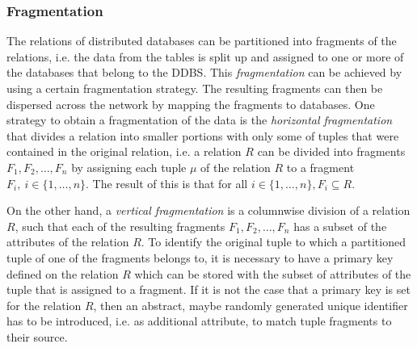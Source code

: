 \subsubsection{Fragmentation}
\label{sec:theo_ddb_frag}
The relations of distributed databases can be partitioned into fragments of the relations, i.e. the data from the tables is split up and assigned to one or more
of the databases that belong to the DDBS. This \emph{fragmentation} can be achieved by using a certain fragmentation strategy. The resulting fragments can then
be dispersed across the network by mapping the fragments to databases.
One strategy to obtain a fragmentation of the data is the \emph{horizontal fragmentation} \cite[p.~105ff.]{Ozsu1991} that divides a relation into smaller 
portions with only some of tuples that were contained in the original relation, i.e. a relation $R$ can be divided into fragments $F_1, F_2,\dots, F_n$ by 
assigning each tuple $\mu$ of the relation $R$ to a fragment $F_i,~i\in\{1,\dots,n\}$. The result of this is that for all $i\in\{1,\dots,n\}, F_i \subseteq R$.
\par
On the other hand, a \emph{vertical fragmentation} \cite[p.~122ff.]{Ozsu1991} is a columnwise division of a relation $R$, such that each of the resulting
fragments $F_1,F_2,\dots,F_n$ has a subset of the attributes of the relation $R$. To identify the original tuple to which a partitioned tuple of one of the
fragments belongs to, it is necessary to have a primary key defined on the relation $R$ which can be stored with the subset of attributes of the tuple that is
assigned to a fragment. If it is not the case that a primary key is set for the relation $R$, then an abstract, maybe randomly generated unique identifier has 
to be introduced, i.e. as additional attribute, to match tuple fragments to their source.


